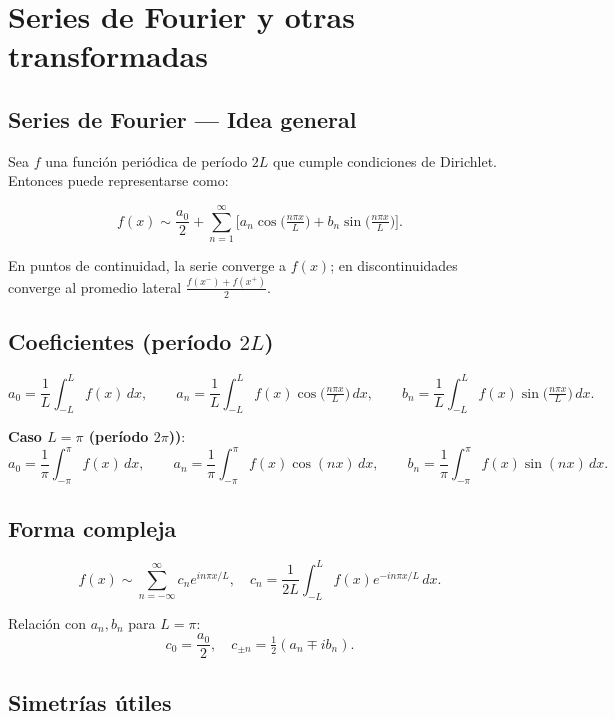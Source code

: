 \documentclass[
  letterpaper,
  DIV=11,
  numbers=noendperiod]{scrreprt}
\begin{document}
\chapter{Series de Fourier y otras
transformadas}\label{series-de-fourier-y-otras-transformadas}

\section{Series de Fourier --- Idea
general}\label{series-de-fourier-idea-general}

Sea \(f\) una función periódica de período \(2L\) que cumple condiciones
de Dirichlet. Entonces puede representarse como:

\[
f(x) \sim \frac{a_0}{2} + \sum_{n=1}^{\infty} \Big[ a_n \cos\!\big(\tfrac{n\pi x}{L}\big) + b_n \sin\!\big(\tfrac{n\pi x}{L}\big) \Big].
\]

En puntos de continuidad, la serie converge a \(f(x)\); en
discontinuidades converge al promedio lateral
\(\tfrac{f(x^-)+f(x^+)}{2}\).

\section{\texorpdfstring{Coeficientes (período
\(2L\))}{Coeficientes (período 2L)}}\label{coeficientes-peruxedodo-2l}

\[
a_0 = \frac{1}{L}\int_{-L}^{L} f(x)\,dx,\qquad
a_n = \frac{1}{L}\int_{-L}^{L} f(x)\cos\!\big(\tfrac{n\pi x}{L}\big)\,dx,\qquad
b_n = \frac{1}{L}\int_{-L}^{L} f(x)\sin\!\big(\tfrac{n\pi x}{L}\big)\,dx.
\]

\textbf{Caso \(L=\pi\) (período \(2\pi\)))}: \[
a_0 = \frac{1}{\pi}\int_{-\pi}^{\pi} f(x)\,dx,\qquad
a_n = \frac{1}{\pi}\int_{-\pi}^{\pi} f(x)\cos(nx)\,dx,\qquad
b_n = \frac{1}{\pi}\int_{-\pi}^{\pi} f(x)\sin(nx)\,dx.
\]

\section{Forma compleja}\label{forma-compleja}

\[
f(x) \sim \sum_{n=-\infty}^{\infty} c_n e^{i n\pi x/L}, \quad c_n = \frac{1}{2L}\int_{-L}^{L} f(x) e^{-i n\pi x/L}\,dx.
\]

Relación con \(a_n,b_n\) para \(L=\pi\): \[
c_0 = \frac{a_0}{2}, \quad c_{\pm n} = \tfrac{1}{2}(a_n \mp i b_n).
\]

\section{Simetrías útiles}\label{simetruxedas-uxfatiles}
\end{document}
